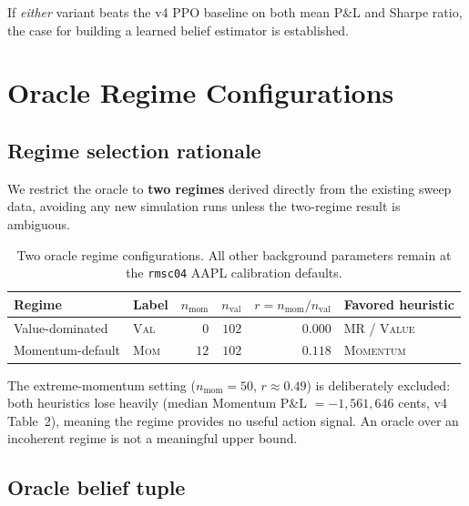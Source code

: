 \documentclass[11pt]{article}
\begin{document}
\noindent
If \emph{either} variant beats the v4 PPO baseline on both mean P\&L and
Sharpe ratio, the case for building a learned belief estimator is
established.

\section{Oracle Regime Configurations}
\label{sec:regimes}

\subsection{Regime selection rationale}

We restrict the oracle to \textbf{two regimes} derived directly from the
existing sweep data, avoiding any new simulation runs unless the two-regime
result is ambiguous.

\begin{table}[H]
\centering
\begin{tabular}{llrrrl}
\toprule
\textbf{Regime} & \textbf{Label} &
  $n_\text{mom}$ & $n_\text{val}$ & $r = n_\text{mom}/n_\text{val}$ &
  \textbf{Favored heuristic} \\
\midrule
Value-dominated  & \textsc{Val} & $0$  & $102$ & $0.000$ & MR / \textsc{Value} \\
Momentum-default & \textsc{Mom} & $12$ & $102$ & $0.118$ & \textsc{Momentum} \\
\bottomrule
\end{tabular}
\caption{Two oracle regime configurations. All other background parameters
         remain at the \texttt{rmsc04} AAPL calibration defaults.}
\label{tab:regimes}
\end{table}

\noindent
The extreme-momentum setting ($n_\text{mom}=50$, $r\approx 0.49$) is
deliberately excluded: both heuristics lose heavily (median Momentum P\&L
$=-1{,}561{,}646$ cents, v4 Table~2), meaning the regime provides no useful
action signal. An oracle over an incoherent regime is not a meaningful upper
bound.

\subsection{Oracle belief tuple}
\end{document}
